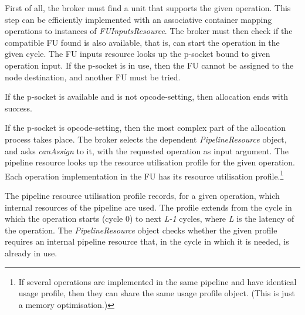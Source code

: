 \documentclass[a4paper,twoside]{tce}
\begin{document}
First of all, the broker must find a unit that supports the given operation.
This step can be efficiently implemented with an associative container
mapping operations to instances of \emph{FUInputsResource}.
%
The broker must then check if the compatible FU found is also available,
that is, can start the operation in the given cycle. The FU inputs resource
looks up the p-socket bound to given operation input. If the p-socket is in
use, then the FU cannot be assigned to the node destination, and another FU
must be tried.

If the p-socket is available and is not opcode-setting, then allocation ends
with success.

If the p-socket is opcode-setting, then the most complex part of the
allocation process takes place. The broker selects the dependent
\emph{PipelineResource} object, and asks \emph{canAssign} to it, with the
requested operation as input argument. The pipeline resource looks up the
resource utilisation profile for the given operation. Each operation
implementation in the FU has its resource utilisation profile.\footnote{
  If several operations are implemented in the same pipeline and have
  identical usage profile, then they can share the same usage profile
  object. (This is just a memory optimisation.)}

The pipeline resource utilisation profile records, for a given operation,
which internal resources of the pipeline are used. The profile extends from
the cycle in which the operation starts (cycle 0) to next \emph{L-1} cycles,
where \emph{L} is the latency of the operation.
%
The \emph{PipelineResource} object checks whether the given profile requires
an internal pipeline resource that, in the cycle in which it is needed, is
already in use.
\end{document}
